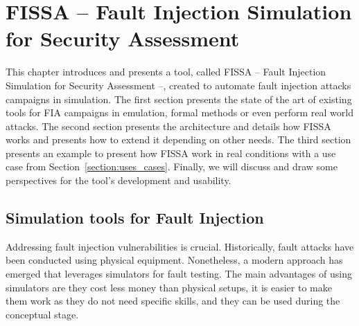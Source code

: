 \chapter{FISSA -- Fault Injection Simulation for Security Assessment}
\label{chapter:fissa}
\minitoc

This chapter introduces and presents a tool, called FISSA -- Fault Injection Simulation for Security Assessment --, created to automate fault injection attacks campaigns in simulation. 
The first section presents the state of the art of existing tools for FIA campaigns in emulation, formal methods or even perform real world attacks.
The second section presents the architecture and details how FISSA works and presents how to extend it depending on other needs.
The third section presents an example to present how FISSA work in real conditions with a use case from Section~\ref{section:uses_cases}.
Finally, we will discuss and draw some perspectives for the tool's development and usability.

\section{Simulation tools for Fault Injection}
Addressing fault injection vulnerabilities is crucial. Historically, fault attacks have been conducted using physical equipment. Nonetheless, a modern approach has emerged that leverages simulators for fault testing. The main advantages of using simulators are they cost less money than physical setups, it is easier to make them work as they do not need specific skills, and they can be used during the conceptual stage.

